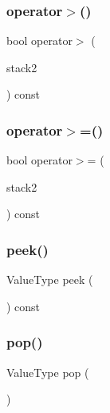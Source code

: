 \mbox{\label{classStack_a5031b32af5984055de8e2bdd4f7312c4}} 
\subsubsection{\texorpdfstring{operator$>$()}{operator>()}}
{\footnotesize\ttfamily bool operator$>$ (\begin{DoxyParamCaption}\item[{const \mbox{\hyperlink{classStack}{Stack}}$<$ Value\+Type $>$ \&}]{stack2 }\end{DoxyParamCaption}) const}

\mbox{\label{classStack_ad2ffb92607a0ad29b040677a695ccea8}} 
\subsubsection{\texorpdfstring{operator$>$=()}{operator>=()}}
{\footnotesize\ttfamily bool operator$>$= (\begin{DoxyParamCaption}\item[{const \mbox{\hyperlink{classStack}{Stack}}$<$ Value\+Type $>$ \&}]{stack2 }\end{DoxyParamCaption}) const}

\mbox{\label{classStack_a7fcf31135d35acfa8ab1174c44bf28f3}} 
\subsubsection{\texorpdfstring{peek()}{peek()}}
{\footnotesize\ttfamily Value\+Type peek (\begin{DoxyParamCaption}{ }\end{DoxyParamCaption}) const}

\mbox{\label{classStack_a278630d7ff14886cdbc3585527e91733}} 
\subsubsection{\texorpdfstring{pop()}{pop()}}
{\footnotesize\ttfamily Value\+Type pop (\begin{DoxyParamCaption}{ }\end{DoxyParamCaption})}

